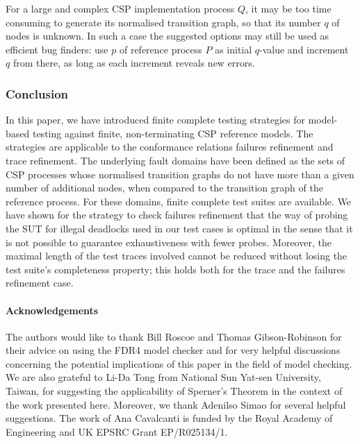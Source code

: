 For a large and complex CSP implementation process $Q$, it may be too time consuming to
generate its normalised transition graph, so that its number $q$ of nodes is
unknown. In such a case the suggested options may still be used as efficient
bug finders: use  $p$ of reference process $P$ as initial $q$-value and
increment $q$ from there, as long as each increment reveals new errors.

\subsubsection*{Conclusion}

In this paper, we have introduced finite complete testing strategies for
model-based testing against finite, non-terminating CSP reference models. The
strategies are applicable to the conformance relations failures refinement
and trace refinement. The underlying fault domains have been defined as the
sets of CSP processes whose normalised transition graphs do not have more
than a given number of additional nodes, when compared to the transition
graph of the reference process. For these domains, finite complete test
suites are available. We have shown for the strategy to check failures
refinement that the way of probing the SUT for illegal deadlocks used in our
test cases is optimal in the sense that it is not possible to guarantee
exhaustiveness with fewer probes. Moreover, the maximal length of the test traces involved cannot be reduced without losing the test suite's completeness property; this holds both for the trace and the failures refinement case.


\paragraph{Acknowledgements}
The authors would like to thank Bill Roscoe and Thomas Gibson-Robinson for
their advice on using the FDR4 model checker and for very helpful discussions
concerning the potential implications of this paper in the field of model
checking. We are also grateful to Li-Da Tong from National Sun Yat-sen
University, Taiwan, for suggesting the applicability of Sperner's Theorem in
the context of the work presented here. Moreover, we thank Adenilso Simao for
several helpful suggestions. The work of Ana Cavalcanti is funded by the
Royal Academy of Engineering and UK EPSRC Grant EP/R025134/1.
